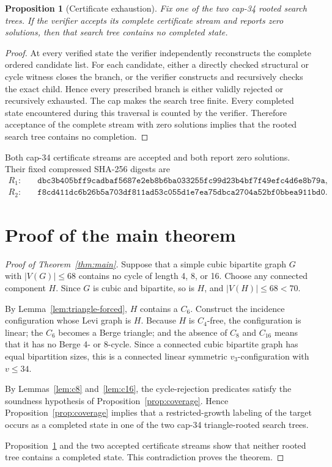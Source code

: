 \documentclass[11pt]{article}
\newtheorem{proposition}[theorem]{Proposition}
\theoremstyle{remark}
\newcommand{\Cfour}{C_4}
\newcommand{\Csix}{C_6}
\newcommand{\Ceight}{C_8}
\newcommand{\Csixteen}{C_{16}}
\newcommand{\vthree}{v_3}
\begin{document}
\begin{proposition}[Certificate exhaustion]\label{prop:certificate}
Fix one of the two cap-34 rooted search trees.  If the verifier accepts its complete certificate stream and reports zero solutions, then that search tree contains no completed state.
\end{proposition}

\begin{proof}
At every verified state the verifier independently reconstructs the complete ordered candidate list.  For each candidate, either a directly checked structural or cycle witness closes the branch, or the verifier constructs and recursively checks the exact child.  Hence every prescribed branch is either validly rejected or recursively exhausted.  The cap makes the search tree finite.  Every completed state encountered during this traversal is counted by the verifier.  Therefore acceptance of the complete stream with zero solutions implies that the rooted search tree contains no completion.
\end{proof}

Both cap-34 certificate streams are accepted and both report zero solutions.  Their fixed compressed SHA-256 digests are
\begin{align*}
R_1:&\quad \texttt{dbc3b405bff9cadbaf5687e2eb8b6ba033255fc99d23b4bf7f49efc4d6e8b79a},\\
R_2:&\quad \texttt{f8cd411dc6b26b5a703df811ad53c055d1e7ea75dbca2704a52bf0bbea911bd0}.
\end{align*}

\section{Proof of the main theorem}\label{sec:mainproof}

\begin{proof}[Proof of Theorem~\ref{thm:main}]
Suppose that a simple cubic bipartite graph \(G\) with \(|V(G)|\le 68\) contains no cycle of length 4, 8, or 16.  Choose any connected component \(H\).  Since \(G\) is cubic and bipartite, so is \(H\), and \(|V(H)|\le 68<70\).

By Lemma~\ref{lem:triangle-forced}, \(H\) contains a \(\Csix\).  Construct the incidence configuration whose Levi graph is \(H\).  Because \(H\) is \(\Cfour\)-free, the configuration is linear; the \(\Csix\) becomes a Berge triangle; and the absence of \(\Ceight\) and \(\Csixteen\) means that it has no Berge 4- or 8-cycle.  Since a connected cubic bipartite graph has equal bipartition sizes, this is a connected linear symmetric \(\vthree\)-configuration with \(v\le 34\).

By Lemmas~\ref{lem:c8} and~\ref{lem:c16}, the cycle-rejection predicates satisfy the soundness hypothesis of Proposition~\ref{prop:coverage}.  Hence Proposition~\ref{prop:coverage} implies that a restricted-growth labeling of the target occurs as a completed state in one of the two cap-34 triangle-rooted search trees.

Proposition~\ref{prop:certificate} and the two accepted certificate streams show that neither rooted tree contains a completed state.  This contradiction proves the theorem.
\end{proof}
\end{document}
